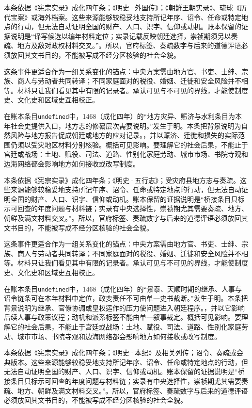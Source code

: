 本条依据《宪宗实录》成化四年条；《明史·外国传》；《朝鲜王朝实录》、琉球《历代宝案》或海外档案。这些来源能够较稳妥地支持所记年序、诏令、任命或特定地点的行动，但无法自动证明全国的财产、人口、识字、信仰或动机。账本保留的证据说明是“译写候选以编年材料定位；实录记载反映朝廷选择，崇祯期须另以奏疏、地方及敌对政权材料交叉。”。所以，官府标签、奏疏数字与后来的道德评语必须放回其文书目的，不能被写成不经分区核验的社会全貌。

这条事件更适合作为一组关系变化的锚点：中央方案需由地方官、书吏、士绅、宗族、商人与劳动者共同转译；不同家庭面对的税役、婚姻、迁徙和安全风险并不相等。材料只让我们看见其中有限的记录者。承认可见与不可见的界线，才能使制度史、文化史和区域史互相校正。

在账本条目\texttt{undefined}中，1468（成化四年）的“地方灾异、赈济与水利条目为本年社会史提供入口，地方志的修纂层次需要说明。”发生于明。本条把背景说明为自然风险与地方报告促成朝廷或地方的应对记录。，并以赈济、迁徙和损失的实际范围仍须以受灾地区材料分别核验。概括可见影响。要理解它的社会后果，不能止于宫廷或战场：土地、赋役、司法、道路、性别化家庭劳动、城市市场、书院寺观和边海网络都会影响地方如何接收或改写制度。

本条依据《宪宗实录》成化四年条；《明史·五行志》；受灾府县地方志与奏疏。这些来源能够较稳妥地支持所记年序、诏令、任命或特定地点的行动，但无法自动证明全国的财产、人口、识字、信仰或动机。账本保留的证据说明是“桥接条目只标示可回查的年度问题与材料链；实录有中央选择性，崇祯期尤其需要奏疏、地方、朝鲜及满文材料交叉。”。所以，官府标签、奏疏数字与后来的道德评语必须放回其文书目的，不能被写成不经分区核验的社会全貌。

这条事件更适合作为一组关系变化的锚点：中央方案需由地方官、书吏、士绅、宗族、商人与劳动者共同转译；不同家庭面对的税役、婚姻、迁徙和安全风险并不相等。材料只让我们看见其中有限的记录者。承认可见与不可见的界线，才能使制度史、文化史和区域史互相校正。

在账本条目\texttt{undefined}中，1468（成化四年）的“景泰、天顺时期的继承、人事与诏令链条可在本年材料中定位，政变责任不可由单一史书裁断。”发生于明。本条把背景说明为继承、官僚协调或皇权运作的压力使问题进入朝廷程序。，并以它影响后续人事与政策议程；动机和派系标签不能由单一叙事裁定。概括可见影响。要理解它的社会后果，不能止于宫廷或战场：土地、赋役、司法、道路、性别化家庭劳动、城市市场、书院寺观和边海网络都会影响地方如何接收或改写制度。

本条依据《宪宗实录》成化四年条；《明史·本纪》及相关列传；诏令、奏疏或会典版本。这些来源能够较稳妥地支持所记年序、诏令、任命或特定地点的行动，但无法自动证明全国的财产、人口、识字、信仰或动机。账本保留的证据说明是“桥接条目只标示可回查的年度问题与材料链；实录有中央选择性，崇祯期尤其需要奏疏、地方、朝鲜及满文材料交叉。”。所以，官府标签、奏疏数字与后来的道德评语必须放回其文书目的，不能被写成不经分区核验的社会全貌。

